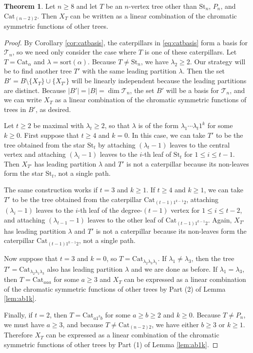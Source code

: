 \documentclass[12pt]{amsart}  %
\theoremstyle{definition}
\newtheorem{theorem}{Theorem}[section]
\theoremstyle{remark}
\numberwithin{equation}{section}
\begin{document}
\begin{theorem}\label{thm:treecoloops}
Let $n\geq 8$ and let $T$ be an $n$-vertex tree other than $\text{St}_n$, $P_n$, and $\text{Cat}_{(n-2)2}$. Then $X_T$ can be written as a linear combination of the chromatic symmetric functions of other trees.
\end{theorem}

\begin{proof}
By Corollary \ref{cor:catbasis}, the caterpillars in \eqref{eq:catbasis} form a basis for $\mathcal T_n$, so we need only consider the case where $T$ is one of these caterpillars. Let $T=\text{Cat}_\alpha$ and $\lambda=\text{sort}(\alpha)$. Because $T\neq\text{St}_n$, we have $\lambda_2\geq 2$. Our strategy will be to find another tree $T'$ with the same leading partition $\lambda$. Then the set $B'=B\setminus\{X_T\}\cup\{X_{T'}\}$ will be linearly independent because the leading partitions are distinct. Because $|B'|=|B|=\dim\mathcal T_n$, the set $B'$ will be a basis for $\mathcal T_n$, and we can write $X_T$ as a linear combination of the chromatic symmetric functions of trees in $B'$, as desired. 

Let $t\geq 2$ be maximal with $\lambda_t\geq 2$, so that $\lambda$ is of the form $\lambda_1\cdots\lambda_t1^k$ for some $k\geq 0$. First suppose that $t\geq 4$ and $k=0$. In this case, we can take $T'$ to be the tree obtained from the star $\text{St}_t$ by attaching $(\lambda_t-1)$ leaves to the central vertex and attaching $(\lambda_i-1)$ leaves to the $i$-th leaf of $\text{St}_t$ for $1\leq i\leq t-1$. Then $X_{T'}$ has leading partition $\lambda$ and $T'$ is not a caterpillar because its non-leaves form the star $\text{St}_t$, not a single path. 

The same construction works if $t=3$ and $k\geq 1$. If $t\geq 4$ and $k\geq 1$, we can take $T'$ to be the tree obtained from the caterpillar $\text{Cat}_{(t-1)1^{k-1}2}$, attaching $(\lambda_i-1)$ leaves to the $i$-th leaf of the degree-$(t-1)$ vertex for $1\leq i\leq t-2$, and attaching $(\lambda_{t-1}-1)$ leaves to the other leaf of $\text{Cat}_{(t-1)1^{k-1}2}$. Again, $X_{T'}$ has leading partition $\lambda$ and $T'$ is not a caterpillar because its non-leaves form the caterpillar $\text{Cat}_{(t-1)1^{k-1}2}$, not a single path.

Now suppose that $t=3$ and $k=0$, so $T=\text{Cat}_{\lambda_2\lambda_3\lambda_1}$. If $\lambda_1\neq\lambda_3$, then the tree $T'=\text{Cat}_{\lambda_2\lambda_1\lambda_3}$ also has leading partition $\lambda$ and we are done as before. If $\lambda_1=\lambda_3$, then $T=\text{Cat}_{aaa}$ for some $a\geq 3$ and $X_T$ can be expressed as a linear combination of the chromatic symmetric functions of other trees by Part (2) of Lemma \ref{lem:ab1k}.

Finally, if $t=2$, then $T=\text{Cat}_{a1^kb}$ for some $a\geq b\geq 2$ and $k\geq 0$. Because $T\neq P_n$, we must have $a\geq 3$, and because $T\neq\text{Cat}_{(n-2)2}$, we have either $b\geq 3$ or $k\geq 1$. Therefore $X_T$ can be expressed as a linear combination of the chromatic symmetric functions of other trees by Part (1) of Lemma \ref{lem:ab1k}. 
\end{proof}
\end{document}
